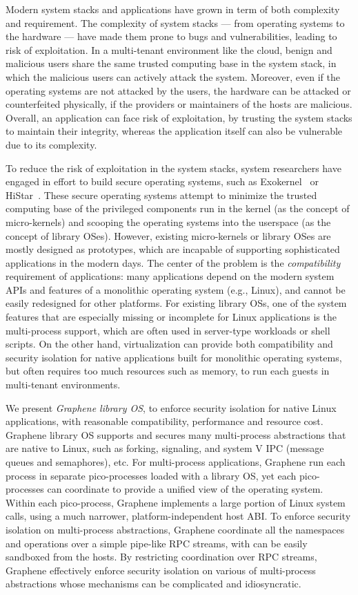 Modern system stacks and applications have grown in term of both complexity and requirement.
The complexity of system stacks --- from operating systems to the hardware --- have made them prone to bugs and vulnerabilities,
leading to risk of exploitation.
In a multi-tenant environment like the cloud, benign and malicious users share the same trusted computing base in the system stack,
in which the malicious users can actively attack the system.
Moreover, even if the operating systems are not attacked by the users,
the hardware can be attacked or counterfeited physically, if the providers or maintainers of the hosts are malicious.
Overall, an application can face risk of exploitation,
by trusting the system stacks to maintain their integrity, whereas the application itself can also be vulnerable due to its complexity.

To reduce the risk of exploitation in the system stacks,
system researchers have engaged in effort to build secure operating systems, such as Exokernel~\citep{engler95exokernel} or HiStar~\citep{zeldovich+histar}.
These secure operating systems attempt to minimize the trusted computing base of the privileged components run in the kernel (as the concept of micro-kernels) and scooping the operating systems into the userspace (as the concept of library OSes).
However, existing micro-kernels or library OSes are mostly designed as prototypes, which are incapable of supporting sophisticated applications in the modern days.
The center of the problem is the {\em compatibility} requirement of applications:
many applications depend on the modern system APIs and features of a monolithic operating system (e.g., Linux), and cannot be easily redesigned for other platforms.
For existing library OSs,
one of the system features that are especially missing or incomplete for Linux applications is the multi-process support,
which are often used in server-type workloads or shell scripts.
On the other hand, virtualization can provide both compatibility and security isolation for native applications built for monolithic operating systems, but often requires too much resources such as memory, to run each guests in multi-tenant environments.

We present {\em Graphene library OS}, to enforce security isolation for native Linux applications,
with reasonable compatibility, performance and resource cost.
Graphene library OS supports and secures many multi-process abstractions that are native to Linux, such as forking, signaling, and system V IPC (message queues and semaphores), etc.
For multi-process applications, Graphene run each process in separate pico-processes loaded with a library OS,
yet each pico-processes can coordinate to provide a unified view of the operating system.
Within each pico-process, Graphene implements a large portion of Linux system calls, using a much narrower, platform-independent host ABI.
To enforce security isolation on multi-process abstractions,
Graphene coordinate all the namespaces and operations
over a simple pipe-like RPC streams, with can be easily sandboxed from the hosts.
By restricting coordination over RPC streams,
Graphene effectively enforce security isolation on various of multi-process abstractions whose mechanisms can be complicated and idiosyncratic.

